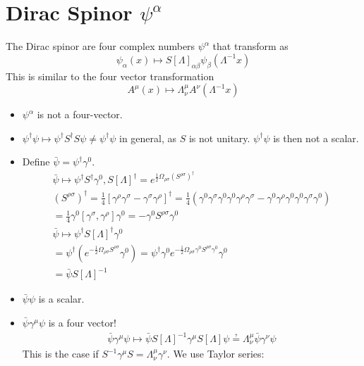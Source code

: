 \documentclass[]{scrartcl}
\begin{document}
\section{Dirac Spinor $\psi^\alpha$}
The Dirac spinor are four complex numbers $\psi^\alpha$ that transform as
\begin{equation}
	\psi_\alpha(x) \mapsto S[\Lambda]_{\alpha\beta} \psi_\beta(\Lambda^{-1}x)
\end{equation}
This is similar to the four vector transformation
$$
A^\mu(x)\mapsto \Lambda^\mu_\nu A^\nu(\Lambda^{-1}x)
$$
\begin{itemize}
	\item $\psi^\alpha$ is not a four-vector.
	\item $\psi^\dagger \psi \mapsto \psi^\dagger S^\dagger S\psi \neq \psi^\dagger\psi$ in general, as $S$ is not unitary. $\psi^\dagger\psi$ is then not a scalar.
	\item Define $\bar\psi = \psi^\dagger\gamma^0$.
	\begin{gather}
	\bar\psi \mapsto \psi^\dagger S^\dagger\gamma^0, S[\Lambda]^\dagger = e^{\frac{1}{2}\Omega_{\rho\sigma}(S^{\rho\sigma})^\dagger}\\
	(S^{\rho\sigma})^\dagger = \frac{1}{4}[\gamma^\rho\gamma^\sigma - \gamma^\sigma\gamma^\rho]^\dagger = \frac{1}{4}(\gamma^0\gamma^\sigma\gamma^0\gamma^0\gamma^\rho\gamma^\sigma - \gamma^0\gamma^\rho\gamma^0\gamma^0\gamma^\sigma\gamma^0)\\
= \frac{1}{4}\gamma^0[\gamma^\sigma,\gamma^\rho]\gamma^0 = -\gamma^0 S^{\rho\sigma} \gamma^0\\
\bar\psi\mapsto\psi^\dagger S[\Lambda]^\dagger \gamma^0\\
= \psi^\dagger(e^{-\frac{1}{2}\Omega_{\rho\sigma}S^{\rho\sigma}}\gamma^0) = \psi^\dagger\gamma^0e^{-\frac{1}{2}\Omega_{\rho\sigma}\gamma^0S^{\rho\sigma}\gamma^0}\gamma^0\\
= \bar\psi S[\Lambda]^{-1}
	\end{gather}
	\item $\bar\psi\psi$ is a scalar.
	\item $\bar\psi\gamma^\mu\psi$ is a four vector!
	\begin{gather}
	\bar\psi\gamma^\mu\psi \mapsto \bar\psi S[\Lambda]^{-1}\gamma^\mu S[\Lambda]\psi \questeq \Lambda^\mu_\nu \bar\psi\gamma^\nu\psi %
	\end{gather}
	This is the case if $S^{-1}\gamma^\mu S = \Lambda^\mu_\nu\gamma^\nu$. We use Taylor series:
	\begin{gather}

\end{gather}
\end{itemize}
\end{document}
